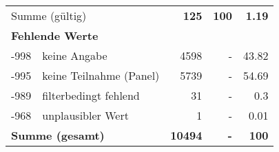 \begin{longtable}{lXrrr}
     \midrule
     \multicolumn{2}{l}{Summe (gültig)} &
       \textbf{\num{125}} &
     \textbf{100} &
       \textbf{\num[round-mode=places,round-precision=2]{1,19}} \\
     \multicolumn{5}{l}{\textbf{Fehlende Werte}}\\
       -998 &
       keine Angabe &
         \num{4598} &
        - &
         \num[round-mode=places,round-precision=2]{43,82} \\
       -995 &
       keine Teilnahme (Panel) &
         \num{5739} &
        - &
         \num[round-mode=places,round-precision=2]{54,69} \\
       -989 &
       filterbedingt fehlend &
         \num{31} &
        - &
         \num[round-mode=places,round-precision=2]{0,3} \\
       -968 &
       unplausibler Wert &
         \num{1} &
        - &
         \num[round-mode=places,round-precision=2]{0,01} \\
     \midrule
     \multicolumn{2}{l}{\textbf{Summe (gesamt)}} &
          \textbf{\num{10494}} &
        \textbf{-} &
        \textbf{100} \\
     \bottomrule
     \end{longtable}
     
